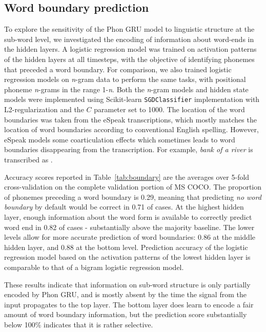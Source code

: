 
\subsection{Word boundary prediction}
To explore the sensitivity of the {\sc Phon GRU} model to linguistic structure at the sub-word level, we investigated the encoding of information about word-ends in the hidden layers. A logistic regression model was trained on activation patterns of the hidden layers at all timesteps, with the objective of identifying phonemes that preceded a word boundary. For comparison, we also trained logistic regression models on \textit{n}-gram data to perform the same tasks, with positional phoneme \textit{n}-grams in the range 1-\textit{n}. Both the \textit{n}-gram models and hidden state models were implemented using Scikit-learn \cite{scikit-learn} {\tt SGDClassifier} implementation with L2-regularization and the $C$ parameter set to 1000. The location of the word boundaries was taken from the eSpeak transcriptions, which mostly matches the location of word boundaries according to conventional English spelling. However, eSpeak models some coarticulation effects which sometimes leads to word boundaries disappearing from the transcription. For example, {\it bank of a river} is transcribed as .

Accuracy scores reported in Table~\ref{tab:boundary} are the averages over 5-fold cross-validation on the complete validation portion of MS COCO. The proportion of phonemes preceding a word boundary is 0.29, meaning that predicting {\it no word boundary} by default would be correct in 0.71 of cases. At the highest hidden layer, enough information about the word form is available to correctly predict word end in 0.82 of cases - substantially above the majority baseline. The lower levels allow for more accurate prediction of word boundaries: 0.86 at the middle hidden layer, and 0.88 at the bottom level. 
Prediction accuracy of the logistic regression model based on the activation patterns of the lowest hidden layer is comparable to that of a bigram logistic regression model.

These results indicate that information on sub-word structure is only partially encoded by {\sc Phon GRU}, and is mostly absent by the time the signal from the input propagates to the top layer. The bottom layer does learn to encode a fair amount of word boundary information, but the prediction score substantially below 100\% indicates that it is rather selective. 

